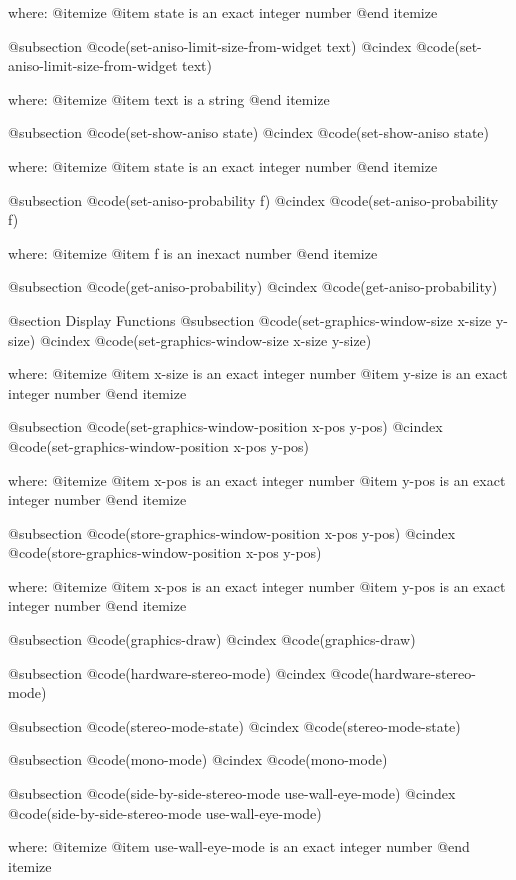 where: 
 @itemize 
     @item state is an exact integer number
 @end itemize


@subsection @code{(set-aniso-limit-size-from-widget text)}
@cindex @code{(set-aniso-limit-size-from-widget text)}
 
where: 
 @itemize 
     @item text is a string
 @end itemize


@subsection @code{(set-show-aniso state)}
@cindex @code{(set-show-aniso state)}
 
where: 
 @itemize 
     @item state is an exact integer number
 @end itemize


@subsection @code{(set-aniso-probability f)}
@cindex @code{(set-aniso-probability f)}
 
where: 
 @itemize 
     @item f is an inexact number
 @end itemize


@subsection @code{(get-aniso-probability)}
@cindex @code{(get-aniso-probability)}
 

@section Display Functions 
@subsection @code{(set-graphics-window-size x-size y-size)}
@cindex @code{(set-graphics-window-size x-size y-size)}
 
where: 
 @itemize 
     @item x-size is an exact integer number
     @item y-size is an exact integer number
 @end itemize


@subsection @code{(set-graphics-window-position x-pos y-pos)}
@cindex @code{(set-graphics-window-position x-pos y-pos)}
 
where: 
 @itemize 
     @item x-pos is an exact integer number
     @item y-pos is an exact integer number
 @end itemize


@subsection @code{(store-graphics-window-position x-pos y-pos)}
@cindex @code{(store-graphics-window-position x-pos y-pos)}
 
where: 
 @itemize 
     @item x-pos is an exact integer number
     @item y-pos is an exact integer number
 @end itemize


@subsection @code{(graphics-draw)}
@cindex @code{(graphics-draw)}
 
@subsection @code{(hardware-stereo-mode)}
@cindex @code{(hardware-stereo-mode)}
 
@subsection @code{(stereo-mode-state)}
@cindex @code{(stereo-mode-state)}
 
@subsection @code{(mono-mode)}
@cindex @code{(mono-mode)}
 
@subsection @code{(side-by-side-stereo-mode use-wall-eye-mode)}
@cindex @code{(side-by-side-stereo-mode use-wall-eye-mode)}
 
where: 
 @itemize 
     @item use-wall-eye-mode is an exact integer number
 @end itemize


